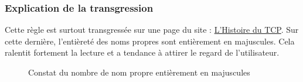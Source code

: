 \documentclass{article}[12pt]
\begin{document}
    \subsubsection*{Explication de la transgression}
    Cette règle est surtout transgressée sur une page du site : \href{http://www.tennisclubdeparis.fr/historique.html}{L'Histoire du TCP}. Sur cette dernière, l'entièreté des noms propres sont entièrement en majuscules. Cela ralentit fortement la lecture et a tendance à attirer le regard de l'utilisateur.
    \begin{figure}[H]
    	\centering  {}
    	\caption{Constat du nombre de nom propre entièrement en majuscules}
    \end{figure}
\end{document}
